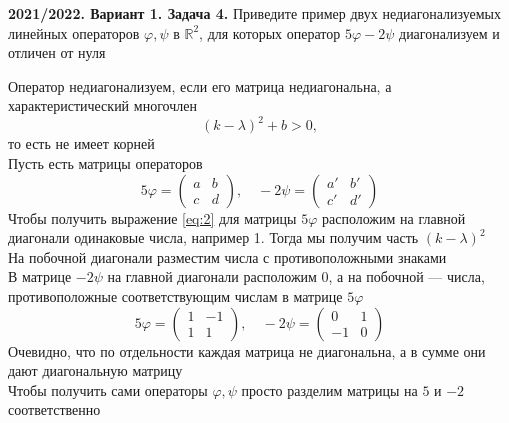 \documentclass[a4paper]{article}
\begin{document}
\newpage



\begin{tcolorbox}[colback=blue!20!white, colframe=black!100!black]
    \textbf{2021/2022. Вариант 1. Задача 4.} Приведите пример двух недиагонализуемых линейных операторов $\varphi, \psi$ в $\mathbb{R}^2$, для которых оператор $5\varphi-2\psi$ диагонализуем и отличен от нуля
\end{tcolorbox}
Оператор недиагонализуем, если его матрица недиагональна, а характеристический многочлен 
\begin{equation}\label{eq:2}
    (k-\lambda)^2+b>0,
\end{equation} то есть не имеет корней\\[2mm]
Пусть есть матрицы операторов $$5\varphi=\begin{pmatrix}
    a&b\\
    c&d
\end{pmatrix},\quad -2\psi=\begin{pmatrix}
    a'&b'\\
    c'&d'
\end{pmatrix}$$
Чтобы получить выражение \ref{eq:2} для матрицы $5\varphi$ расположим на главной диагонали одинаковые числа, например 1. Тогда мы получим часть $(k-\lambda)^2$\\[2mm]
На побочной диагонали разместим числа с противоположными знаками\\[2mm]
В матрице $-2\psi$ на главной диагонали расположим 0, а на побочной — числа, противоположные соответствующим числам в матрице $5\varphi$
\begin{equation*}
    5\varphi=\begin{pmatrix}
    1&-1\\
    1&1
\end{pmatrix},\quad -2\psi=\begin{pmatrix}
    0&1\\
    -1&0
\end{pmatrix}
\end{equation*}
Очевидно, что по отдельности каждая матрица не диагональна, а в сумме они дают диагональную матрицу\\[2mm]
Чтобы получить сами операторы $\varphi,\psi$ просто разделим матрицы на $5$ и $-2$ соответственно


\newpage
\end{document}
